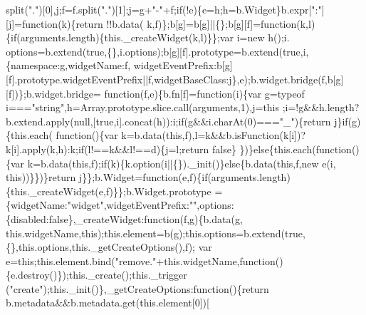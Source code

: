 \begin{DoxyCode}
      split(\textcolor{stringliteral}{"."})[0],j;f=f.split(\textcolor{stringliteral}{"."})[1];j=g+\textcolor{stringliteral}{"-"}+f;\textcolor{keywordflow}{if}(!e)\{e=h;h=b.Widget\}b.expr[\textcolor{stringliteral}{":"}][j]=\textcolor{keyword}{function}(k)\{\textcolor{keywordflow}{return} !!b.data(
      k,f)\};b[g]=b[g]||\{\};b[g][f]=\textcolor{keyword}{function}(k,l)\{\textcolor{keywordflow}{if}(arguments.length)\{this.\_createWidget(k,l)\}\};var i=\textcolor{keyword}{new} h();i.
      options=b.extend(\textcolor{keyword}{true},\{\},i.options);b[g][f].prototype=b.extend(\textcolor{keyword}{true},i,\{\textcolor{keyword}{namespace}:g,widgetName:f,
      widgetEventPrefix:b[g][f].prototype.widgetEventPrefix||f,widgetBaseClass:j\},e);b.widget.bridge(f,b[g][f])\};b.widget.bridge=\textcolor{keyword}{
      function}(f,e)\{b.fn[f]=\textcolor{keyword}{function}(i)\{var g=typeof i===\textcolor{stringliteral}{"string"},h=Array.prototype.slice.call(arguments,1),j=\textcolor{keyword}{this}
      ;i=!g&&h.length?b.extend.apply(null,[\textcolor{keyword}{true},i].concat(h)):i;\textcolor{keywordflow}{if}(g&&i.charAt(0)===\textcolor{stringliteral}{"\_"})\{\textcolor{keywordflow}{return} j\}\textcolor{keywordflow}{if}(g)\{this.each(\textcolor{keyword}{
      function}()\{var k=b.data(\textcolor{keyword}{this},f),l=k&&b.isFunction(k[i])?k[i].apply(k,h):k;\textcolor{keywordflow}{if}(l!==k&&l!==d)\{j=l;\textcolor{keywordflow}{return} \textcolor{keyword}{false}\}
      \})\}\textcolor{keywordflow}{else}\{this.each(\textcolor{keyword}{function}()\{var k=b.data(\textcolor{keyword}{this},f);\textcolor{keywordflow}{if}(k)\{k.option(i||\{\}).\_init()\}\textcolor{keywordflow}{else}\{b.data(\textcolor{keyword}{this},f,\textcolor{keyword}{new} e(i,\textcolor{keyword}{
      this}))\}\})\}\textcolor{keywordflow}{return} j\}\};b.Widget=\textcolor{keyword}{function}(e,f)\{\textcolor{keywordflow}{if}(arguments.length)\{this.\_createWidget(e,f)\}\};b.Widget.prototype
      =\{widgetName:\textcolor{stringliteral}{"widget"},widgetEventPrefix:\textcolor{stringliteral}{""},options:\{disabled:\textcolor{keyword}{false}\},\_createWidget:\textcolor{keyword}{function}(f,g)\{b.data(g,
      this.widgetName,\textcolor{keyword}{this});this.element=b(g);this.options=b.extend(\textcolor{keyword}{true},\{\},this.options,this.\_getCreateOptions(),f);
      var e=\textcolor{keyword}{this};this.element.bind(\textcolor{stringliteral}{"remove."}+this.widgetName,\textcolor{keyword}{function}()\{e.destroy()\});this.\_create();this.\_trigger
      (\textcolor{stringliteral}{"create"});this.\_init()\},\_getCreateOptions:\textcolor{keyword}{function}()\{\textcolor{keywordflow}{return} b.metadata&&b.metadata.get(this.element[0])[

\end{DoxyCode}
